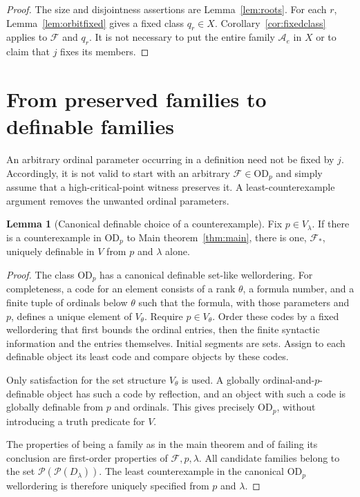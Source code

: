 \documentclass[11pt,letterpaper]{article}
\theoremstyle{definition}
\newtheorem{lemma}[definition]{Lemma}
\numberwithin{equation}{section}
\newcommand{\OD}{\mathrm{OD}}
\newcommand{\Pow}{\mathcal P}
\newcommand{\FF}{\mathcal F}
\newcommand{\calA}{\mathcal A}
\begin{document}
\begin{proof}
The size and disjointness assertions are Lemma~\ref{lem:roots}. For each $r$, Lemma~\ref{lem:orbitfixed} gives a fixed class $q_r\in X$. Corollary~\ref{cor:fixedclass} applies to $\FF$ and $q_r$. It is not necessary to put the entire family $\calA_e$ in $X$ or to claim that $j$ fixes its members.
\end{proof}

\section{From preserved families to definable families}\label{sec:global}

An arbitrary ordinal parameter occurring in a definition need not be fixed by $j$. Accordingly, it is not valid to start with an arbitrary $\FF\in\OD_p$ and simply assume that a high-critical-point witness preserves it. A least-counterexample argument removes the unwanted ordinal parameters.

\begin{lemma}[Canonical definable choice of a counterexample]\label{lem:least}
Fix $p\in V_\lambda$. If there is a counterexample in $\OD_p$ to Main theorem~\ref{thm:main}, there is one, $\FF_*$, uniquely definable in $V$ from $p$ and $\lambda$ alone.
\end{lemma}

\begin{proof}
The class $\OD_p$ has a canonical definable set-like wellordering. For completeness, a code for an element consists of a rank $\theta$, a formula number, and a finite tuple of ordinals below $\theta$ such that the formula, with those parameters and $p$, defines a unique element of $V_\theta$. Require $p\in V_\theta$. Order these codes by a fixed wellordering that first bounds the ordinal entries, then the finite syntactic information and the entries themselves. Initial segments are sets. Assign to each definable object its least code and compare objects by these codes.

Only satisfaction for the set structure $V_\theta$ is used. A globally ordinal-and-$p$-definable object has such a code by reflection, and an object with such a code is globally definable from $p$ and ordinals. This gives precisely $\OD_p$, without introducing a truth predicate for $V$.

The properties of being a family as in the main theorem and of failing its conclusion are first-order properties of $\FF,p,\lambda$. All candidate families belong to the set $\Pow(\Pow(D_\lambda))$. The least counterexample in the canonical $\OD_p$ wellordering is therefore uniquely specified from $p$ and $\lambda$.
\end{proof}
\end{document}

